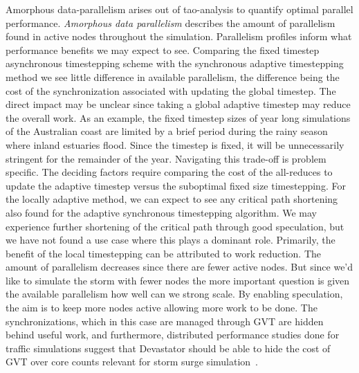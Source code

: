 Amorphous data-parallelism arises out of tao-analysis to quantify optimal parallel performance. {\em Amorphous data parallelism} describes the amount of parallelism found in active nodes throughout the simulation. Parallelism profiles inform what performance benefits we may expect to see. Comparing the fixed timestep asynchronous timestepping scheme with the synchronous adaptive timestepping method we see little difference in available parallelism, the difference being the cost of the synchronization associated with updating the global timestep. The direct impact may be unclear since taking a global adaptive timestep may reduce the overall work. As an example, the fixed timestep sizes of year long simulations of the Australian coast are limited by a brief period during the rainy season where inland estuaries flood. Since the timestep is fixed, it will be unnecessarily stringent for the remainder of the year.
 Navigating this trade-off is problem specific. The deciding factors require comparing the cost of the all-reduces to update the adaptive timestep versus the suboptimal fixed size timestepping. 
  For the locally adaptive method, we can expect to see any critical path shortening also found for the adaptive synchronous timestepping algorithm. We may experience further shortening of the critical path through good speculation, but we have not found a use case where this plays a dominant role. Primarily, the benefit of the local timestepping can be attributed to work reduction. The amount of parallelism decreases since there are fewer active nodes. But since we'd like to simulate the storm with fewer nodes the more important question is given the available parallelism how well can we strong scale. By enabling speculation, the aim is to keep more nodes active allowing more work to be done. The synchronizations, which in this case are managed through GVT are hidden behind useful work, and furthermore, distributed performance studies done for traffic simulations suggest that Devastator should be able to hide the cost of GVT over core counts relevant for storm surge simulation~\cite{Chan2018}. 
  


